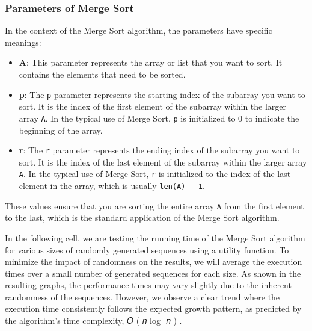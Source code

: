 \documentclass[11pt]{article}
\begin{document}
    \hypertarget{parameters-of-merge-sort}{%
\subsubsection{Parameters of Merge
Sort}\label{parameters-of-merge-sort}}

In the context of the Merge Sort algorithm, the parameters have specific
meanings:

\begin{itemize}
\item
  \textbf{A}: This parameter represents the array or list that you want
  to sort. It contains the elements that need to be sorted.
\item
  \textbf{p}: The \texttt{p} parameter represents the starting index of
  the subarray you want to sort. It is the index of the first element of
  the subarray within the larger array \texttt{A}. In the typical use of
  Merge Sort, \texttt{p} is initialized to 0 to indicate the beginning
  of the array.
\item
  \textbf{r}: The \texttt{r} parameter represents the ending index of
  the subarray you want to sort. It is the index of the last element of
  the subarray within the larger array \texttt{A}. In the typical use of
  Merge Sort, \texttt{r} is initialized to the index of the last element
  in the array, which is usually \texttt{len(A)\ -\ 1}.
\end{itemize}

These values ensure that you are sorting the entire array \texttt{A}
from the first element to the last, which is the standard application of
the Merge Sort algorithm.

    In the following cell, we are testing the running time of the Merge Sort
algorithm for various sizes of randomly generated sequences using a
utility function. To minimize the impact of randomness on the results,
we will average the execution times over a small number of generated
sequences for each size. As shown in the resulting graphs, the
performance times may vary slightly due to the inherent randomness of
the sequences. However, we observe a clear trend where the execution
time consistently follows the expected growth pattern, as predicted by
the algorithm's time complexity, 𝑂 ( 𝑛 log ⁡ 𝑛 ) .
\end{document}

